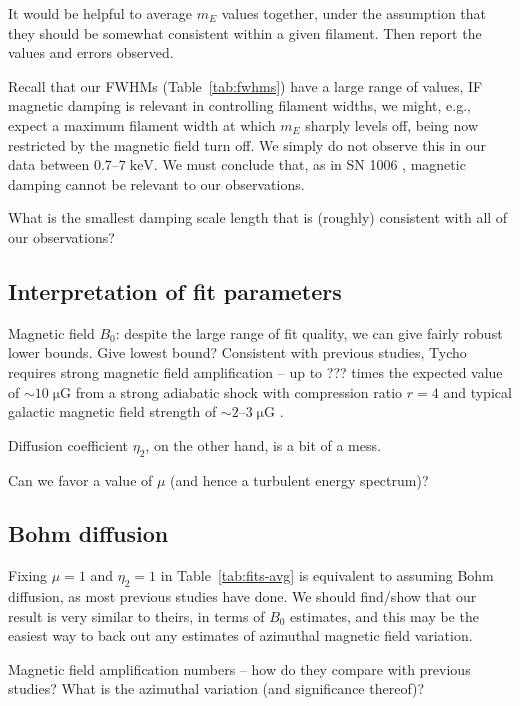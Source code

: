 \documentclass[iop, apj, numberedappendix, twocolappendix]{emulateapj}
\newcommand*{\mt}{\mathrm}
\newcommand*{\unit}[1]{\;\mt{#1}}  %
\newcommand*{\abt}{\mathord{\sim}} %
\begin{document}
It would be helpful to average $m_E$ values together, under the
assumption that they should be somewhat consistent within a given filament.
Then report the values and errors observed.

Recall that our FWHMs (Table~\ref{tab:fwhms}) have a large range of values,
IF magnetic damping is relevant in controlling filament widths, we might, e.g.,
expect a maximum filament width at which $m_E$ sharply levels off, being now
restricted by the magnetic field turn off.  We simply do not observe this in
our data between $0.7$--$7 \unit{keV}$.  We must conclude that, as in SN 1006
, magnetic damping cannot be relevant to our
observations.

What is the smallest damping scale length that is (roughly) consistent with all
of our observations?

\subsection{Interpretation of fit parameters}

Magnetic field $B_0$: despite the large range of fit quality, we can give
fairly robust lower bounds.  Give lowest bound?  Consistent with previous
studies, Tycho requires strong magnetic field amplification -- up to ??? times
the expected value of $\abt 10 \unit{\mu G}$ from a strong adiabatic shock with
compression ratio $r=4$ and typical galactic magnetic field strength of $\abt
2$--$3 \unit{\mu G}$ \citep{lyne1989, han2006}.

Diffusion coefficient $\eta_2$, on the other hand, is a bit of a mess.

Can we favor a value of $\mu$ (and hence a turbulent energy spectrum)?

\subsection{Bohm diffusion}

Fixing $\mu = 1$ and $\eta_2 = 1$ in Table~\ref{tab:fits-avg} is equivalent to
assuming Bohm diffusion, as most previous studies have done.
We should find/show that our result is very similar to theirs, in terms of
$B_0$ estimates, and this may be the easiest way to back out any estimates of
azimuthal magnetic field variation.

Magnetic field amplification numbers -- how do they compare with previous
studies?  What is the azimuthal variation (and significance thereof)?
\end{document}
